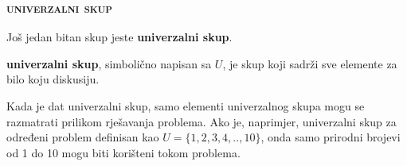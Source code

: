 \documentclass[a4paper,14pt,svgnames]{article}
\begin{document}
\newpage
\subsubsection{\textsc{univerzalni skup}}
\bigskip\bigskip
Još jedan bitan skup jeste \textbf{univerzalni skup}.\smallskip

\begin{tcolorbox}
\textbf{univerzalni skup}, simbolično napisan sa $U$, je skup koji sadrži sve elemente za bilo koju diskusiju.
\end{tcolorbox}\medskip

Kada je dat univerzalni skup, samo elementi univerzalnog skupa mogu se razmatrati prilikom rješavanja problema. Ako je, naprimjer, univerzalni skup za određeni problem definisan kao $U=\{1, 2, 3, 4, .., 10\}$, onda samo prirodni brojevi od 1 do 10 mogu biti korišteni tokom problema.
\end{document}
